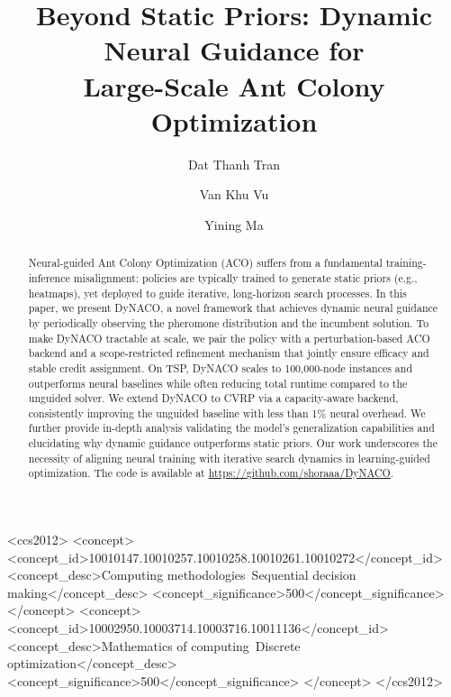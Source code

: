 \documentclass[sigconf]{acmart}
\begin{document}
\title{Beyond Static Priors: Dynamic Neural Guidance for \\Large-Scale Ant Colony Optimization}

\author{Dat Thanh Tran}
\orcid{}

\author{Van Khu Vu}

\author{Yining Ma}

\begin{abstract}
Neural-guided Ant Colony Optimization (ACO) suffers from a fundamental training-inference misalignment: policies are typically trained to generate static priors (e.g., heatmaps), yet deployed to guide iterative, long-horizon search processes. In this paper, we present DyNACO, a novel framework that achieves dynamic neural guidance by periodically observing the pheromone distribution and the incumbent solution. To make DyNACO tractable at scale, we pair the policy with a perturbation-based ACO backend and a scope-restricted refinement mechanism that jointly ensure efficacy and stable credit assignment. On TSP, DyNACO scales to 100,000-node instances and outperforms neural baselines while often reducing total runtime compared to the unguided solver. We extend DyNACO to CVRP via a capacity-aware backend, consistently improving the unguided baseline with less than 1\% neural overhead. We further provide in-depth analysis validating the model's generalization capabilities and elucidating why dynamic guidance outperforms static priors. Our work underscores the necessity of aligning neural training with iterative search dynamics in learning-guided optimization. The code is available at \url{https://github.com/shoraaa/DyNACO}.
\end{abstract}

\begin{CCSXML}
<ccs2012>
   <concept>
       <concept_id>10010147.10010257.10010258.10010261.10010272</concept_id>
       <concept_desc>Computing methodologies~Sequential decision making</concept_desc>
       <concept_significance>500</concept_significance>
       </concept>
   <concept>
       <concept_id>10002950.10003714.10003716.10011136</concept_id>
       <concept_desc>Mathematics of computing~Discrete optimization</concept_desc>
       <concept_significance>500</concept_significance>
       </concept>
 </ccs2012>
\end{CCSXML}
\end{document}
